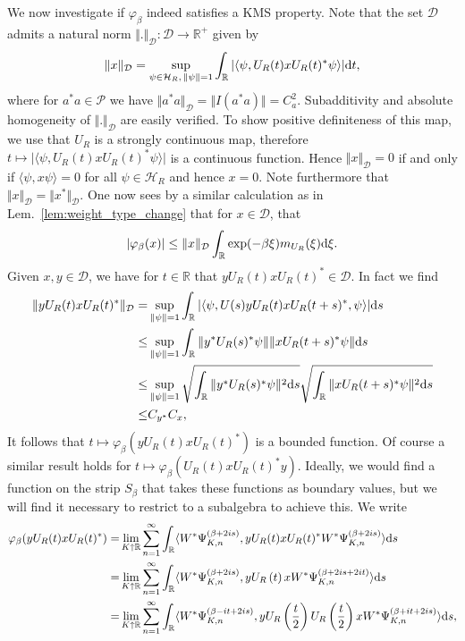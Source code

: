 \documentclass[sn-mathphys-num]{sn-jnl}%
\newcommand{\RR}{\mathbb{R}}
\newcommand{\HH}{\mathcal{H}}
\newcommand{\diff}{\textup{d}}
\numberwithin{equation}{section}
\theoremstyle{thmstyleone}%
\theoremstyle{thmstyletwo}%
\theoremstyle{thmstylethree}%
\begin{document}
We now investigate if $\varphi_\beta$ indeed satisfies a KMS property. Note that the set $\mathcal{D}$ admits a natural norm $\Vert.\Vert_{\mathcal{D}}:\mathcal{D}\to\RR^+$ given by
\begin{equation}
    \Vert x\Vert_\mathcal{D}=\sup_{\psi\in\HH_R,\,\Vert\psi\Vert=1}\int_\RR\vert\langle \psi,U_R(t)xU_R(t)^*\psi\rangle\vert\diff t,
\end{equation}
where for $a^*a\in \mathcal{P}$ we have $\Vert a^*a\Vert_\mathcal{D}=\Vert I(a^*a)\Vert=C_{a}^2$. Subadditivity and absolute homogeneity of $\Vert.\Vert_{\mathcal{D}}$ are easily verified. To show positive definiteness of this map, we use that $U_R$ is a strongly continuous map, therefore $t\mapsto \vert\langle \psi,U_R(t)xU_R(t)^*\psi\rangle\vert$ is a continuous function. Hence $\Vert x\Vert_\mathcal{D}=0$ if and only if $\langle \psi,x\psi\rangle=0$ for all $\psi\in\HH_R$ and hence $x=0$. Note furthermore that $\Vert x\Vert_\mathcal{D}=\Vert x^*\Vert_\mathcal{D}$.
One now sees by a similar calculation as in Lem.\ \ref{lem:weight_type_change} that for $x\in\mathcal{D}$, that 
\begin{equation}
    \vert \varphi_\beta(x)\vert\leq \Vert x\Vert_{\mathcal{D}}\int_\RR \exp(-\beta\xi)m_{U_R}(\xi)\diff\xi.
\end{equation}
Given $x,y\in\mathcal{D}$, we have for $t\in \RR$ that $yU_R(t)xU_R(t)^*\in \mathcal{D}$. In fact we find
\begin{align}
    \Vert yU_R(t)xU_R(t)^*\Vert_\mathcal{D}=&\sup_{\Vert\psi\Vert=1}\int_\RR\vert \langle\psi,U(s)yU_R(t)xU_R(t+s)^*,\psi\rangle\vert \diff s\nonumber\\
    \leq& \sup_{\Vert\psi\Vert=1}\int_\RR\Vert y^*U_R(s)^*\psi\Vert\Vert xU_R(t+s)^*\psi\Vert \diff s\nonumber\\
    \leq& \sup_{\Vert\psi\Vert=1}\sqrt{\int_\RR\Vert y^*U_R(s)^*\psi\Vert^2\diff s}\sqrt{\int_\RR\Vert xU_R(t+s)^*\psi\Vert^2 \diff s}\nonumber\\
    \leq& C_{y^*}C_{x},
\end{align}
It follows that $t\mapsto \varphi_\beta(yU_R(t)xU_R(t)^*)$ is a bounded function. Of course a similar result holds for $t\mapsto \varphi_\beta(U_R(t)xU_R(t)^*y)$. Ideally, we would find a function on the strip $S_\beta$ that takes these functions as boundary values, but we will find it necessary to restrict to a subalgebra to achieve this. We write
\begin{align}
    \varphi_\beta(yU_R(t)xU_R(t)^*)=&\lim_{K\uparrow\RR}\sum_{n=1}^\infty \int_\RR \langle W^*\Psi_{K,n}^{(\beta+2is)},yU_R(t)xU_R(t)^* W^*\Psi_{K,n}^{(\beta+2is)}\rangle\diff s\nonumber\\
    =&\lim_{K\uparrow\RR}\sum_{n=1}^\infty \int_\RR \langle W^*\Psi_{K,n}^{(\beta+2is)},yU_R\left(t\right)xW^*\Psi_{K,n}^{(\beta+2is+2it)}\rangle\diff s\nonumber\\
    =&\lim_{K\uparrow\RR}\sum_{n=1}^\infty \int_\RR \langle W^*\Psi_{K,n}^{(\beta-it+2is)},yU_R\left(\frac{t}{2}\right)U_R\left(\frac{t}{2}\right)xW^*\Psi_{K,n}^{(\beta+it+2is)}\rangle\diff s,
\end{align}
\end{document}
